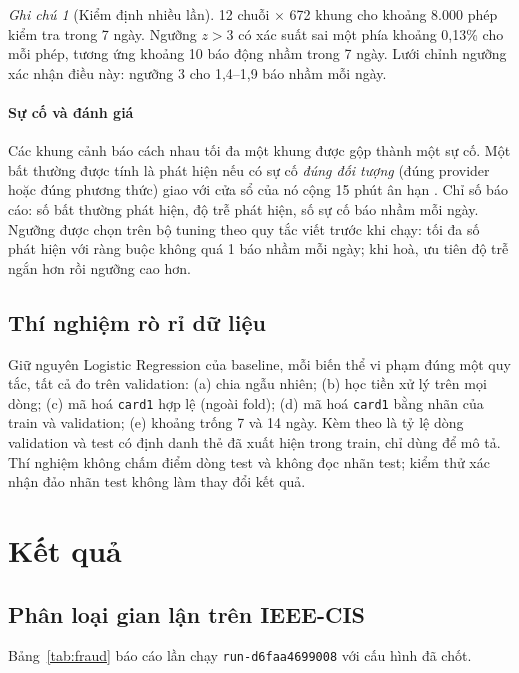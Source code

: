 \documentclass[11pt,a4paper]{article}
\theoremstyle{definition}
\theoremstyle{remark}
\newtheorem{remark}{Ghi chú}
\newcommand{\code}[1]{\texttt{#1}}
\numberwithin{equation}{section}
\begin{document}
\begin{remark}[Kiểm định nhiều lần]
12 chuỗi $\times$ 672 khung cho khoảng 8.000 phép kiểm tra trong 7 ngày. Ngưỡng $z>3$ có xác suất sai một phía khoảng 0,13\% cho mỗi phép, tương ứng khoảng 10 báo động nhầm trong 7 ngày. Lưới chỉnh ngưỡng xác nhận điều này: ngưỡng 3 cho 1,4--1,9 báo nhầm mỗi ngày.
\end{remark}

\paragraph{Sự cố và đánh giá} Các khung cảnh báo cách nhau tối đa một khung được gộp thành một sự cố. Một bất thường được tính là phát hiện nếu có sự cố \emph{đúng đối tượng} (đúng provider hoặc đúng phương thức) giao với cửa sổ của nó cộng 15 phút ân hạn \cite{lavin}. Chỉ số báo cáo: số bất thường phát hiện, độ trễ phát hiện, số sự cố báo nhầm mỗi ngày. Ngưỡng được chọn trên bộ tuning theo quy tắc viết trước khi chạy: tối đa số phát hiện với ràng buộc không quá 1 báo nhầm mỗi ngày; khi hoà, ưu tiên độ trễ ngắn hơn rồi ngưỡng cao hơn.

\subsection{Thí nghiệm rò rỉ dữ liệu}\label{sec:leak}
Giữ nguyên Logistic Regression của baseline, mỗi biến thể vi phạm đúng một quy tắc, tất cả đo trên validation: (a) chia ngẫu nhiên; (b) học tiền xử lý trên mọi dòng; (c) mã hoá \code{card1} hợp lệ (ngoài fold); (d) mã hoá \code{card1} bằng nhãn của train và validation; (e) khoảng trống 7 và 14 ngày. Kèm theo là tỷ lệ dòng validation và test có định danh thẻ đã xuất hiện trong train, chỉ dùng để mô tả. Thí nghiệm không chấm điểm dòng test và không đọc nhãn test; kiểm thử xác nhận đảo nhãn test không làm thay đổi kết quả.

\section{Kết quả}
\subsection{Phân loại gian lận trên IEEE-CIS}\label{sec:res-fraud}
Bảng~\ref{tab:fraud} báo cáo lần chạy \code{run-d6faa4699008} với cấu hình đã chốt.
\end{document}
